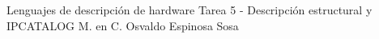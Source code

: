 




	\pnormal
	{Lenguajes de descripción de hardware}
	{Tarea 5 - Descripción estructural y IPCATALOG}
	{M. en C. Osvaldo Espinosa Sosa}
	\tableofcontents
	
	\newpage 
	\clearpage 



